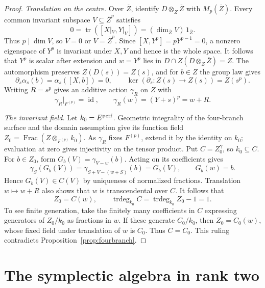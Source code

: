 \documentclass[11pt,a4paper]{article}
\theoremstyle{definition}
\begin{document}
\begin{proof}
\emph{Translation on the centre.}
Over \(\overline Z\), identify \(D\otimes_Z\overline Z\) with \(M_p(\overline Z)\). Every common invariant subspace \(V\subseteq\overline Z^p\) satisfies
\[
 0=\operatorname{tr}([X|_V,Y|_V])=(\dim_{\overline Z}V)\,1_{\overline Z}.
\]
Thus \(p\mid\dim V\), so \(V=0\) or \(V=\overline Z^p\). Since \([X,Y^p]=pY^{p-1}=0\), a nonzero eigenspace of \(Y^p\) is invariant under \(X,Y\) and hence is the whole space. It follows that \(Y^p\) is scalar after extension and \(w=Y^p\) lies in \(D\cap Z(D\otimes_Z\overline Z)=Z\). The automorphism
preserves \(Z(D(s))=Z(s)\), and for \(b\in Z\) the group law gives
\[
 \partial_s\alpha_s(b)=\alpha_s([X,b])=0,\qquad
 \ker(\partial_s:Z(s)\to Z(s))=Z(s^p).
\]
Writing \(R=s^p\) gives an additive action \(\gamma_R\) on \(Z\) with
\[
 \gamma_R|_{F^{(p)}}=\operatorname{id},\qquad
 \gamma_R(w)=(Y+s)^p=w+R .
\]

\emph{The invariant field.}
Let \(k_0=E^{\rm perf}\). Geometric integrality of the four-branch
surface and the domain assumption give its function field
\(Z_0=\operatorname{Frac}(Z\otimes_{F^{(p)}}k_0)\).
As \(\gamma_R\) fixes \(F^{(p)}\), extend it by the identity on
\(k_0\); evaluation at zero gives injectivity on the tensor product.
Put \(C=Z_0^\gamma\), so \(k_0\subseteq C\). For \(b\in Z_0\), form
\(G_b(V)=\gamma_{V-w}(b)\). Acting on its coefficients gives
\[
 \gamma_S(G_b(V))=\gamma_{S+V-(w+S)}(b)=G_b(V),\qquad G_b(w)=b .
\]
Hence \(G_b(V)\in C(V)\) by uniqueness of normalized fractions.
Translation \(w\mapsto w+R\) also shows that \(w\) is transcendental
over \(C\). It follows that
\[
 Z_0=C(w),\qquad \operatorname{trdeg}_{k_0} C
   =\operatorname{trdeg}_{k_0}Z_0-1=1 .
\]
To see finite generation, take the finitely many coefficients in
\(C\) expressing generators of \(Z_0/k_0\) as fractions in \(w\).
If these generate \(C_0/k_0\), then \(Z_0=C_0(w)\), whose fixed
field under translation of \(w\) is \(C_0\). Thus \(C=C_0\).
This ruling contradicts Proposition~\ref{prop:fourbranch}.
\end{proof}


\section{\texorpdfstring{The symplectic algebra in rank two}{The symplectic algebra in rank two}}
\label{sec:paper-c2}
\end{document}
